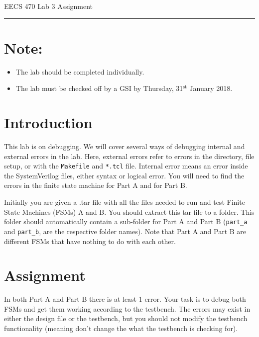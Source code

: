 \documentclass{article}
\newcommand{\shortbar}{
	\vspace*{-12pt}
	\begin{center}
		\rule{5ex}{0.1pt}
	\end{center}
}
\newcommand{\lab}[1]{
	\begin{center}
		\LARGE{
			\vspace*{-12pt}
			EECS 470 Lab #1 Assignment
			\shortbar
		}
	\end{center}
}
\begin{document}
\vspace*{-20pt}
\lab{3}
\vspace*{-20pt}

\section*{Note:}
\begin{itemize}
	\item The lab should be completed individually.
	\item The lab must be checked off by a GSI by
	Thursday, 31$^\text{st}$ January 2018.
\end{itemize}

\section{Introduction}
This lab is on debugging. We will cover several ways of debugging internal and
external errors in the lab. Here, external errors refer to errors in the
directory, file setup, or with the \texttt{Makefile} and \texttt{*.tcl} file. 
Internal error means an error inside the SystemVerilog files, either syntax or 
logical error. You will need to find the errors in the finite state machine for 
Part A and for Part B.

Initially you are given a .tar file with all the files needed to run and test
Finite State Machines (FSMs) A and B. You should extract this tar file to a
folder. This folder should automatically contain a sub-folder for Part A and
Part B (\texttt{part\_a} and \texttt{part\_b}, are the respective folder
names). Note that Part A and Part B are different FSMs that have nothing to do
with each other.

\section{Assignment}
In both Part A and Part B there is at least 1 error.
Your task is to debug both FSMs and get them working according to the testbench.
The errors may exist in either the design file or the testbench, but you should not
modify the testbench functionality (meaning don't change the what the testbench is 
checking for).
\end{document}
